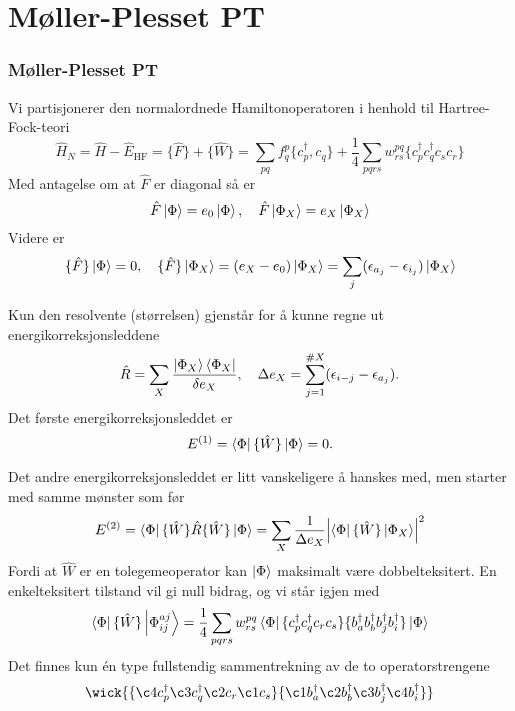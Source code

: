 \documentclass{beamer}
\begin{document}
\section{Møller-Plesset PT}

\begin{frame}
	\frametitle{Møller-Plesset PT}
	Vi partisjonerer den normalordnede Hamiltonoperatoren i henhold til Hartree-Fock-teori
	\begin{equation}
		\hat H_N = \hat H - \hat E_{\text{HF}} = \{\hat F \} + \{ \hat W \} = \sum_{pq}f_q^p \{ c^\dagger_p, c_q\} + \frac{1}{4}\sum_{pqrs}w^{pq}_{rs} \{c^\dagger_p c^\dagger_q c_s c_r \}
	\end{equation}
	Med antagelse om at $\hat F$ er diagonal så er 
	\begin{equation}
		\hat F\ket{\Phi} = e_0 \ket{\Phi}, \quad \hat F \ket{\Phi_X} = e_X \ket{\Phi_X}
	\end{equation}
	Videre er 
	\begin{equation}
		\{\hat F\} \ket{\Phi} = 0, \quad \{\hat F\} \ket{\Phi_X} = (e_X - e_0)\ket{\Phi_X} = \sum_j(\epsilon_{a_j} - \epsilon_{i_j})\ket{\Phi_X}
	\end{equation}
\end{frame}

\begin{frame}
	Kun den resolvente (størrelsen) gjenstår for å kunne regne ut energikorreksjonsleddene
	\begin{equation}
		\hat R = \sum_{X}\frac{\ket{\Phi_X}\bra{\Phi_X}}{\delta e_X}, \quad \Delta e_X = \sum_{j=1}^{\# X}(\epsilon_{i-j} - \epsilon_{a_j}).
	\end{equation}
	Det første energikorreksjonsleddet er
	\begin{equation}
		E^{(1)} = \bra{\Phi} \{\hat W \} \ket{\Phi} = 0.
	\end{equation}
\end{frame}

\begin{frame}
	Det andre energikorreksjonsleddet er litt vanskeligere å hanskes med, men starter med samme mønster som før
	\begin{equation}
		E^{(2)} = \bra{\Phi}\{\hat W\} \hat R \{\hat W\} \ket{\Phi} = \sum_X \frac{1}{\Delta e_X} \abs{\bra{\Phi}\{\hat W\} \ket{\Phi_X}}^2
	\end{equation}
	Fordi at $\hat W$ er en tolegemeoperator kan $\ket{\Phi}$ maksimalt være dobbelteksitert. En enkelteksitert tilstand vil gi null bidrag, og vi står igjen med
	\begin{align}
		\bra{\Phi} \{\hat W\}\ket{\Phi_{ij}^{aj}} = \frac{1}{4} \sum_{pqrs} w_{rs}^{pq} \bra{\Phi} \{c^\dagger_p c^\dagger_q c_r c_s \} \{b^\dagger_a b^\dagger_b b^\dagger_j b^\dagger_i  \}\ket{\Phi}
	\end{align}
	Det finnes kun én type fullstendig sammentrekning av de to operatorstrengene
	\begin{equation}
		\wick{
		\{\c4 c^\dagger_p \c3 c^\dagger_q \c2 c_r \c1 c_s \} \{ \c1 b^\dagger_a \c2 b^\dagger_b \c3 b^\dagger_j  \c4 b^\dagger_i  \}
		}	
	\end{equation}
\end{frame}
\end{document}
